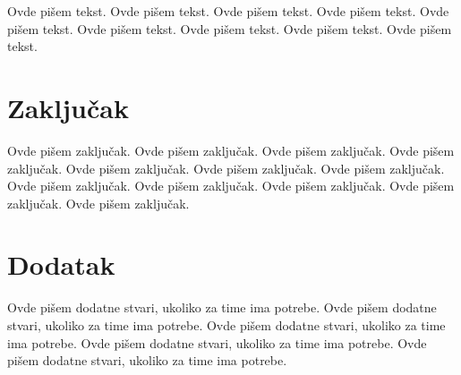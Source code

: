 \documentclass[a4paper]{article}
\begin{document}
Ovde pišem tekst. 
Ovde pišem tekst. 
Ovde pišem tekst. 
Ovde pišem tekst. 
Ovde pišem tekst. 
Ovde pišem tekst. 
Ovde pišem tekst. 
Ovde pišem tekst. 
Ovde pišem tekst. 

\section{Zaključak}
\label{sec:zakljucak}

Ovde pišem zaključak. 
Ovde pišem zaključak. 
Ovde pišem zaključak. 
Ovde pišem zaključak. 
Ovde pišem zaključak. 
Ovde pišem zaključak. 
Ovde pišem zaključak. 
Ovde pišem zaključak. 
Ovde pišem zaključak. 
Ovde pišem zaključak. 
Ovde pišem zaključak. 
Ovde pišem zaključak. 


\appendix
 


\appendix
\section{Dodatak}
Ovde pišem dodatne stvari, ukoliko za time ima potrebe.
Ovde pišem dodatne stvari, ukoliko za time ima potrebe.
Ovde pišem dodatne stvari, ukoliko za time ima potrebe.
Ovde pišem dodatne stvari, ukoliko za time ima potrebe.
Ovde pišem dodatne stvari, ukoliko za time ima potrebe.
\end{document}
